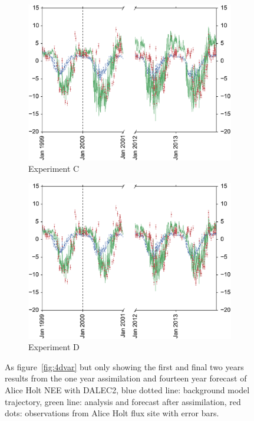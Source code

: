 \documentclass[review]{elsarticle}
\begin{document}
\begin{figure}
\begin{subfigure}[b]{0.49\textwidth}
        \includegraphics[width=\textwidth]{Cbroke4dvar.eps}
        \caption{Experiment C}
        \label{fig:broke4dvarBcorR}
    \end{subfigure}
    \begin{subfigure}[b]{0.49\textwidth}
        \includegraphics[width=\textwidth]{Dbroke4dvar.eps}
        \caption{Experiment D}
        \label{fig:broke4dvaredcBcorR}
    \end{subfigure}
    \caption{As figure~\ref{fig:4dvar} but only showing the first and final two years results from the one year assimilation and fourteen year forecast of Alice Holt NEE with DALEC2, blue dotted line: background model trajectory, green line: analysis and forecast after assimilation, red dots: observations from Alice Holt flux site with error bars.}\label{fig:broke4dvar}
\end{figure}
\end{document}
